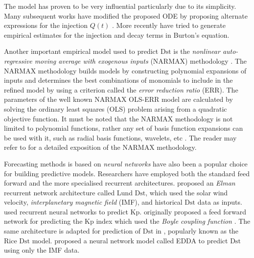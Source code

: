 The \citet{JGR:JGR10260} model has proven to be very influential particularly due to its 
simplicity. Many subsequent works have modified the proposed ODE by proposing alternate 
expressions for the injection $Q(t)$ \citep{Wang:Dst,JGRA:JGRA14856}. More recently 
\citet{Ballatore2014} have tried to generate empirical estimates for the injection and decay terms 
in Burton's equation.

Another important empirical model used to predict $\mathrm{Dst}$ is the 
\emph{nonlinear auto-regressive moving average with exogenous inputs} (NARMAX) methodology 
\citep{doi:10.1080/00207178908559767,GRL:GRL13494,GRL:GRL20944,JGRA:JGRA18657,balikhin:narmax,
JGRA:JGRA20661,JGRA:JGRA50192}. The NARMAX methodology builds models by constructing polynomial 
expansions of inputs and determines the best combinations of monomials to include in the refined 
model by using a criterion called the \emph{error reduction ratio} (ERR). The parameters of the 
well known NARMAX OLS-ERR model are calculated by solving the ordinary least squares (OLS) 
problem arising from a quadratic objective function. It must be noted that the NARMAX methodology 
is not limited to polynomial functions, rather any set of basis function expansions can be used 
with it, such as radial basis functions, wavelets, etc \citep{doi:10.1080/00207720600903011,
JGRA:JGRA17327}. The reader may refer to \citet{billings2013nonlinear} for a detailed exposition of 
the NARMAX methodology.

Forecasting methods is based on \emph{neural networks} have also been a popular 
choice for building predictive models. Researchers have employed both the standard 
feed forward and the more specialised recurrent architectures. \citet{Lund} proposed an 
\emph{Elman} recurrent network architecture called Lund $\mathrm{Dst}$, which used the 
solar wind velocity, \emph{interplanetary magnetic field} (IMF), and historical $\mathrm{Dst}$ data 
as inputs. \citet{JGRA:JGRA17461} used recurrent neural networks to predict $\mathrm{Kp}$. 
\citet{SWE:SWE286} originally proposed a feed forward network for predicting the 
$\mathrm{Kp}$ index which used the \emph{Boyle coupling function} \citep{boyle1997empirical}. The 
same architecture is adapted for prediction of $\mathrm{Dst}$ in \citet{SWE:SWE286}, popularly 
known as the Rice $\mathrm{Dst}$ model. \citet{pallocchia:hal-00318011} proposed a neural network 
model called EDDA to predict $\mathrm{Dst}$ using only the IMF data.

